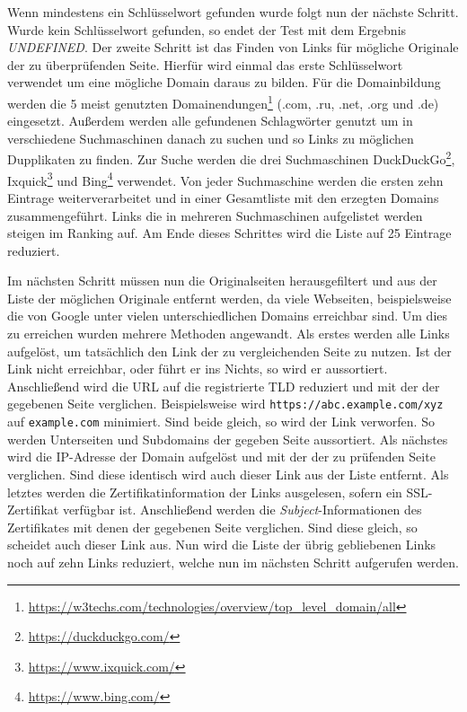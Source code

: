 Wenn mindestens ein Schlüsselwort gefunden wurde folgt nun der nächste Schritt. Wurde kein Schlüsselwort gefunden, so endet der Test mit dem Ergebnis \textit{UNDEFINED}. Der zweite Schritt ist das Finden von Links für mögliche Originale der zu überprüfenden Seite. Hierfür wird einmal das erste Schlüsselwort verwendet um eine mögliche Domain daraus zu bilden. Für die Domainbildung werden die 5 meist genutzten Domainendungen\footnote{\url{https://w3techs.com/technologies/overview/top_level_domain/all}} (.com, .ru, .net, .org und .de) eingesetzt. Außerdem werden alle gefundenen Schlagwörter genutzt um in verschiedene Suchmaschinen danach zu suchen und so Links zu möglichen Dupplikaten zu finden. Zur Suche werden die drei Suchmaschinen DuckDuckGo\footnote{\url{https://duckduckgo.com/}}, Ixquick\footnote{\url{https://www.ixquick.com/}} und Bing\footnote{\url{https://www.bing.com/}} verwendet. Von jeder Suchmaschine werden die ersten zehn Eintrage weiterverarbeitet und in einer Gesamtliste mit den erzegten Domains zusammengeführt. Links die in mehreren Suchmaschinen aufgelistet werden steigen im Ranking auf. Am Ende dieses Schrittes wird die Liste auf 25 Eintrage reduziert.

Im nächsten Schritt müssen nun die Originalseiten herausgefiltert und aus der Liste der möglichen
Originale entfernt werden, da viele Webseiten, beispielsweise die von Google unter vielen
unterschiedlichen Domains erreichbar sind. Um dies zu erreichen wurden mehrere Methoden angewandt.
Als erstes werden alle Links aufgelöst, um tatsächlich den Link der zu vergleichenden Seite zu
nutzen. Ist der Link nicht erreichbar, oder führt er ins Nichts, so wird er aussortiert.
Anschließend wird die \acs{URL} auf die registrierte \ac{TLD} reduziert und mit der der gegebenen
Seite verglichen. Beispielsweise wird \lstinline[style=eclipse]{https://abc.example.com/xyz} auf \lstinline[style=eclipse]{example.com} minimiert. Sind beide gleich, so wird der Link verworfen. So werden Unterseiten und Subdomains der gegeben Seite aussortiert. Als nächstes wird die IP-Adresse der Domain aufgelöst und mit der der zu prüfenden Seite verglichen. Sind diese identisch wird auch dieser Link aus der Liste entfernt. Als letztes werden die Zertifikatinformation der Links ausgelesen, sofern ein \acs{SSL}-Zertifikat verfügbar ist. Anschließend werden die \textit{Subject}-Informationen des Zertifikates mit denen der gegebenen Seite verglichen. Sind diese gleich, so scheidet auch dieser Link aus. Nun wird die Liste der übrig gebliebenen Links noch auf zehn Links reduziert, welche nun im nächsten Schritt aufgerufen werden.

